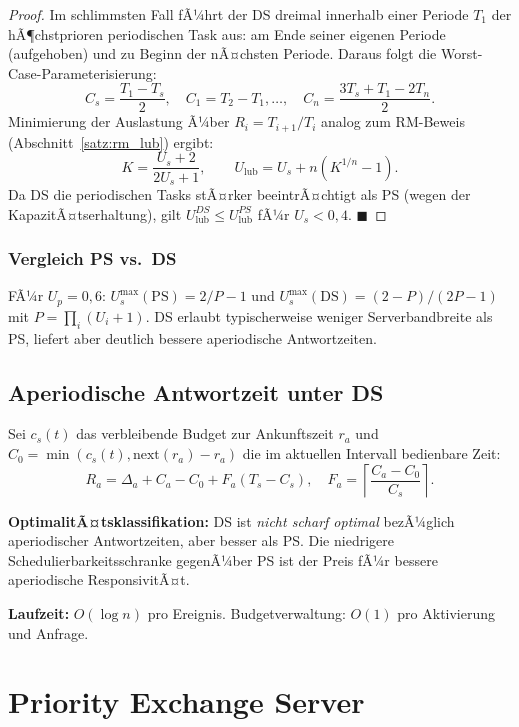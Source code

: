 ﻿\documentclass[a4paper,12pt]{report}
\theoremstyle{definition}
\begin{document}
\begin{proof}
	Im schlimmsten Fall fÃ¼hrt der DS dreimal innerhalb einer Periode $T_1$ der
	hÃ¶chstprioren periodischen Task aus: am Ende seiner eigenen Periode (aufgehoben)
	und zu Beginn der nÃ¤chsten Periode. Daraus folgt die Worst-Case-Parameterisierung:
	\[
		C_s = \frac{T_1 - T_s}{2}, \quad C_1 = T_2 - T_1, \ldots, \quad
		C_n = \frac{3T_s + T_1 - 2T_n}{2}.
	\]
	Minimierung der Auslastung Ã¼ber $R_i = T_{i+1}/T_i$ analog zum RM-Beweis
	(Abschnitt~\ref{satz:rm_lub}) ergibt:
	\[
		K = \frac{U_s + 2}{2U_s + 1}, \qquad U_{\text{lub}} = U_s + n(K^{1/n} - 1).
	\]
	Da DS die periodischen Tasks stÃ¤rker beeintrÃ¤chtigt als PS (wegen der
	KapazitÃ¤tserhaltung), gilt $U_{\text{lub}}^{DS} \leq U_{\text{lub}}^{PS}$
	fÃ¼r $U_s < 0{,}4$. \hfill$\blacksquare$
\end{proof}

\subsubsection{Vergleich PS vs.\ DS}

FÃ¼r $U_p = 0{,}6$: $U_s^{\max}(\text{PS}) = 2/P - 1$ und $U_s^{\max}(\text{DS}) = (2-P)/(2P-1)$
mit $P = \prod_{i}(U_i+1)$. DS erlaubt typischerweise weniger Serverbandbreite
als PS, liefert aber deutlich bessere aperiodische Antwortzeiten.

\subsection{Aperiodische Antwortzeit unter DS}

Sei $c_s(t)$ das verbleibende Budget zur Ankunftszeit $r_a$ und $C_0 = \min(c_s(t), \text{next}(r_a) - r_a)$ die im aktuellen Intervall bedienbare Zeit:
\[
	R_a = \Delta_a + C_a - C_0 + F_a(T_s - C_s),
	\quad F_a = \left\lceil \frac{C_a - C_0}{C_s} \right\rceil.
\]

\textbf{OptimalitÃ¤tsklassifikation:} DS ist \emph{nicht scharf optimal}
bezÃ¼glich aperiodischer Antwortzeiten, aber besser als PS. Die niedrigere
Schedulierbarkeitsschranke gegenÃ¼ber PS ist der Preis fÃ¼r bessere aperiodische
ResponsivitÃ¤t.

\textbf{Laufzeit:} $O(\log n)$ pro Ereignis. Budgetverwaltung: $O(1)$ pro
Aktivierung und Anfrage.

\section{Priority Exchange Server}
\end{document}
